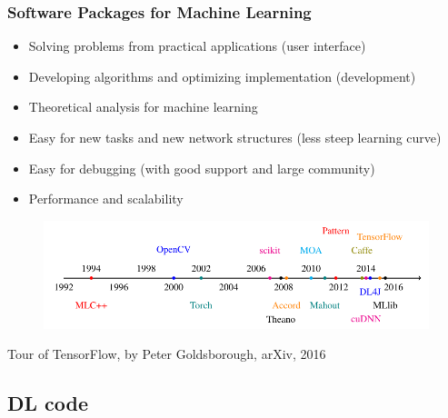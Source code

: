 \begin{frame}
  \MyLogo
  \frametitle{Software Packages for Machine Learning}  
\small

\begin{itemize}
\item Solving problems from practical applications (user interface)
\item Developing algorithms and optimizing implementation (development)
\item Theoretical analysis for machine learning
\end{itemize}

\begin{itemize}
\item Easy for new tasks and new network structures (less steep learning curve)
\item Easy for debugging (with good support and large community)
\item Performance and scalability
\end{itemize}

\vskip -12pt
\begin{figure}[htbp] %
   \centering
   \includegraphics[width=0.9\linewidth]{figures/ML.pdf} 
\end{figure}

\begin{center}
{\color{red} \scriptsize
Tour of TensorFlow, by Peter Goldsborough, arXiv, 2016}
\end{center}


\end{frame}

\subsection{DL code}

